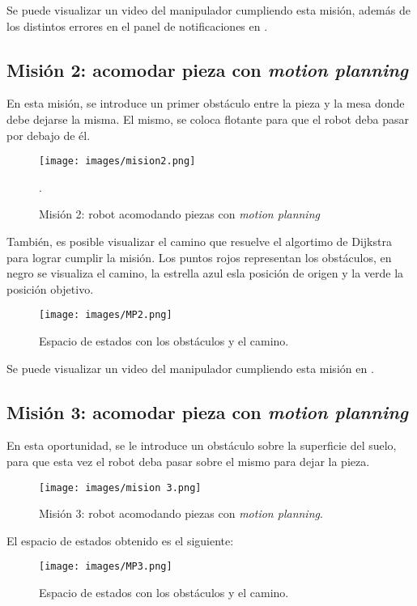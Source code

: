 Se puede visualizar un video del manipulador cumpliendo esta misión, además de los distintos errores en el panel de notificaciones en \cite{1}.

\subsection{Misión 2: acomodar pieza con \textit{motion planning}}
En esta misión, se introduce un primer obstáculo entre la pieza y la mesa donde debe dejarse la misma. El mismo, se coloca flotante para que el robot deba pasar por debajo de él.
\newpage
\begin{figure}[h!]
	\centering
	\texttt{[image: images/mision2.png]}
	\caption{Misión 2: robot acomodando piezas con \textit{motion planning}}.
	\label{fig:M2}
\end{figure}

También, es posible visualizar el camino que resuelve el algortimo de Dijkstra para lograr cumplir la misión. Los puntos rojos representan los obstáculos, en negro se visualiza el camino, la estrella azul esla posición de origen y la verde la posición objetivo.

\begin{figure}[h!]
	\centering
	\texttt{[image: images/MP2.png]}
	\caption{Espacio de estados con los obstáculos y el camino.}
	\label{fig:M22}
\end{figure}

Se puede visualizar un video del manipulador cumpliendo esta misión en \cite{2}.
\newpage
\subsection{Misión 3: acomodar pieza con \textit{motion planning}}
En esta oportunidad, se le introduce un obstáculo sobre la superficie del suelo, para que esta vez el robot deba pasar sobre el mismo para dejar la pieza.
\begin{figure}[h!]
	\centering
	\texttt{[image: images/mision 3.png]}
	\caption{Misión 3: robot acomodando piezas con \textit{motion planning}.}
	\label{fig:M3}
\end{figure}

El espacio de estados obtenido es el siguiente:
\begin{figure}[h!]
	\centering
	\texttt{[image: images/MP3.png]}
	\caption{Espacio de estados con los obstáculos y el camino.}
	\label{fig:M32}
\end{figure}

